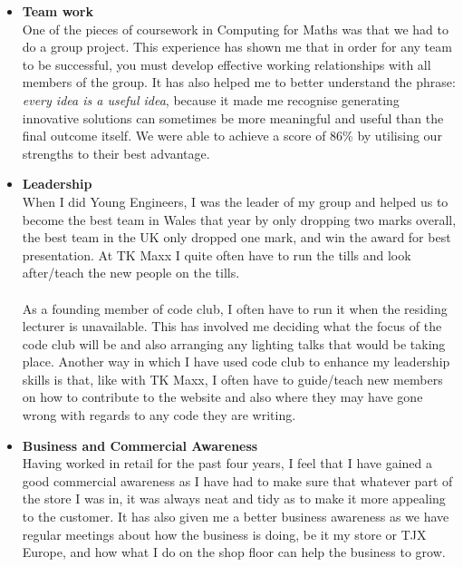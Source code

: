 \documentclass[a4paper]{res}
\begin{document}
\begin{resume}
\begin{itemize}
\item \textbf{Team work} \\
One of the pieces of coursework in Computing for Maths was that we had to do a
group project. This experience has shown me that in order for any team to be
successful, you must develop effective working relationships with all members of
the group. It has also helped me to better understand the phrase:
\textit{every idea is a useful idea}, because it made me recognise generating
innovative solutions can sometimes be more meaningful and useful than the final
outcome itself. We were able to achieve a score of 86\% by utilising our
strengths to their best advantage. \\


\item \textbf{Leadership} \\
When I did Young Engineers, I was the leader of my group and helped us to become
the best team in Wales that year by only dropping two marks overall, the best
team in the UK only dropped one mark, and win the award for best presentation.
At TK Maxx I quite often have to run the tills and look after/teach the new
people on the tills. \\
\\
As a founding member of code club, I often have to run it when the residing
lecturer is unavailable. This has involved me deciding what the focus of the
code club will be and also arranging any lighting talks that would be taking
place. Another way in which I have used code club to enhance my leadership
skills is that, like with TK Maxx, I often have to guide/teach new members on
how to contribute to the website and also where they may have gone wrong with
regards to any code they are writing. \\

\item \textbf{Business and Commercial Awareness} \\
Having worked in retail for the past four years, I feel that I have gained a
good commercial awareness as I have had to make sure that whatever part of the
store I was in, it was always neat and tidy as to make it more appealing to the
customer. It has also given me a better business awareness as we have regular
meetings about how the business is doing, be it my store or TJX Europe, and how
what I do on the shop floor can help the business to grow.
\end{itemize}


\end{resume}
\end{document}
